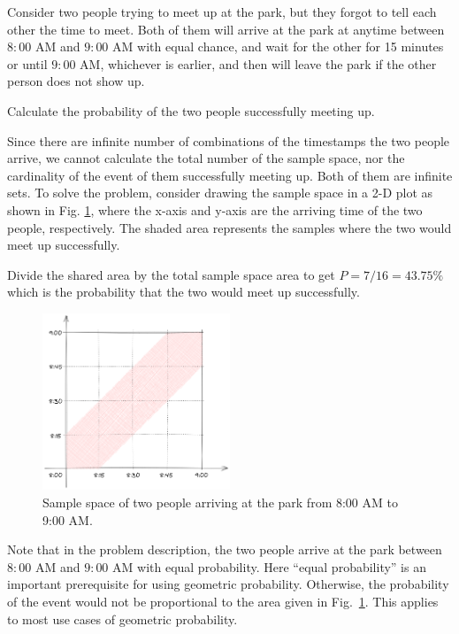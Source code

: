 \begin{shortbox}
Consider two people trying to meet up at the park, but they forgot to tell each other the time to meet. Both of them will arrive at the park at anytime between $8:00$ AM and $9:00$ AM with equal chance, and wait for the other for 15 minutes or until $9:00$ AM, whichever is earlier, and then will leave the park if the other person does not show up.

Calculate the probability of the two people successfully meeting up.

\end{shortbox}

Since there are infinite number of combinations of the timestamps the two people arrive, we cannot calculate the total number of the sample space, nor the cardinality of the event of them successfully meeting up. Both of them are infinite sets. To solve the problem, consider drawing the sample space in a 2-D plot as shown in Fig. \ref{fig:geometricprobexp}, where the x-axis and y-axis are the arriving time of the two people, respectively. The shaded area represents the samples where the two would meet up successfully.

Divide the shared area by the total sample space area to get $P=7/16=43.75\%$ which is the probability that the two would meet up successfully.

\begin{figure}[!htb]
	\centering
	\includegraphics[width=0.5\textwidth]{chapters/part-1/figures/geometricprobexp.png}
	\caption{Sample space of two people arriving at the park from 8:00 AM to 9:00 AM.} \label{fig:geometricprobexp}
\end{figure}

Note that in the problem description, the two people arrive at the park between $8:00$ AM and $9:00$ AM with equal probability. Here ``equal probability'' is an important prerequisite for using geometric probability. Otherwise, the probability of the event would not be proportional to the area given in Fig.~\ref{fig:geometricprobexp}. This applies to most use cases of geometric probability.

